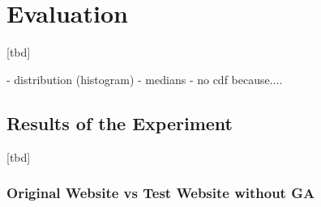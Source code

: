 \chapter{Evaluation}

[tbd]













- distribution (histogram)
- medians
- no cdf because....






\section{Results of the Experiment}

[tbd]










\subsection{Original Website vs Test Website without GA}

